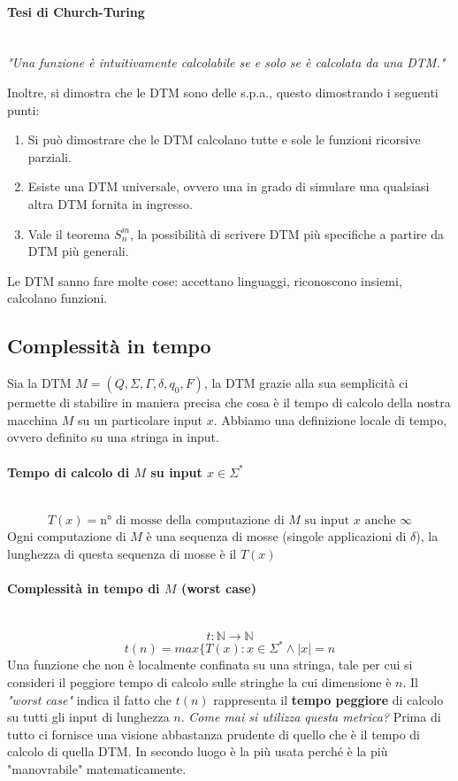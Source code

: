 \documentclass{article}
\begin{document}
\paragraph{Tesi di Church-Turing}\mbox{}\\
\textit{"Una funzione è intuitivamente calcolabile se e solo se è calcolata
    da una DTM."}

Inoltre, si dimostra che le DTM sono delle s.p.a., questo dimostrando
i seguenti punti:
\begin{enumerate}
    \item Si può dimostrare che le DTM calcolano tutte e sole le funzioni ricorsive
          parziali.
    \item Esiste una DTM universale, ovvero una in grado di simulare una qualsiasi
          altra DTM fornita in ingresso.
    \item Vale il teorema $S_n^m$, la possibilità di scrivere DTM più specifiche
          a partire da DTM più generali.
\end{enumerate}
Le DTM sanno fare molte cose: accettano linguaggi, riconoscono insiemi,
calcolano funzioni.

\subsection{Complessità in tempo}
Sia la DTM $M=(Q,\Sigma,\Gamma,\delta,q_0,F)$, la DTM grazie alla sua semplicità
ci permette di stabilire in maniera precisa che cosa è il tempo di calcolo
della nostra macchina $M$ su un particolare input $x$. Abbiamo una definizione
locale di tempo, ovvero definito su una stringa in input.

\paragraph{Tempo di calcolo di $M$ su input $x\in\Sigma^*$}\mbox{}\\
$$T(x)=\text{n° di mosse della computazione di }M\text{ su input }x\text{ anche }\infty$$
Ogni computazione di $M$ è una sequenza di mosse (singole
applicazioni di $\delta$), la lunghezza di questa
sequenza di mosse è il $T(x)$

\paragraph{Complessità in tempo di $M$ (worst case)}\mbox{}\\
$$t:\mathbb{N}\rightarrow\mathbb{N}$$
$$t(n)=max\{T(x):x\in\Sigma^*\land|x|=n$$
Una funzione che non è localmente confinata su una stringa, tale per cui
si consideri il peggiore tempo di calcolo sulle stringhe la cui dimensione
è $n$. Il \textit{"worst case"} indica il fatto che $t(n)$ rappresenta il
\textbf{tempo peggiore} di calcolo su tutti gli input di lunghezza $n$.
\textit{Come mai si utilizza questa metrica?} Prima di tutto ci fornisce
una visione abbastanza prudente di quello che è il tempo di calcolo
di quella DTM. In secondo luogo è la più usata perché è la più
"manovrabile" matematicamente.
\end{document}
